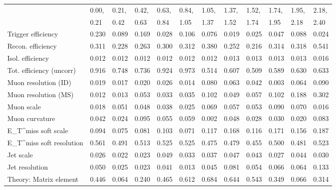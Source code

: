 \begin{tabular}{l|p{0.6cm}p{0.6cm}p{0.6cm}p{0.6cm}p{0.6cm}p{0.6cm}p{0.6cm}p{0.6cm}p{0.6cm}p{0.6cm}p{0.6cm}}
\hline
   & 0.00, & 0.21, & 0.42, & 0.63, & 0.84, & 1.05, & 1.37, & 1.52, & 1.74, & 1.95, & 2.18,  \\ 
   & 0.21 & 0.42 & 0.63 & 0.84 & 1.05 & 1.37 & 1.52 & 1.74 & 1.95 & 2.18 & 2.40  \\ 
\hline
Trigger efficiency                       & 0.230 & 0.089 & 0.169 & 0.028 & 0.106 & 0.076 & 0.019 & 0.025 & 0.047 & 0.088 & 0.024 \\
Recon. efficiency                        & 0.311 & 0.228 & 0.263 & 0.300 & 0.312 & 0.380 & 0.252 & 0.216 & 0.314 & 0.318 & 0.541 \\
Isol. efficiency                         & 0.012 & 0.012 & 0.012 & 0.012 & 0.012 & 0.012 & 0.013 & 0.013 & 0.013 & 0.013 & 0.016 \\
Tot. efficiency (uncorr)                 & 0.916 & 0.748 & 0.736 & 0.924 & 0.973 & 0.514 & 0.607 & 0.509 & 0.589 & 0.630 & 0.633 \\
Muon resolution (ID)                     & 0.019 & 0.017 & 0.020 & 0.026 & 0.014 & 0.080 & 0.063 & 0.042 & 0.003 & 0.064 & 0.090 \\
Muon resolution (MS)                     & 0.012 & 0.013 & 0.053 & 0.033 & 0.035 & 0.102 & 0.049 & 0.057 & 0.102 & 0.188 & 0.302 \\
Muon scale                               & 0.018 & 0.051 & 0.048 & 0.038 & 0.025 & 0.069 & 0.057 & 0.053 & 0.090 & 0.070 & 0.016 \\
Muon curvature                           & 0.042 & 0.024 & 0.095 & 0.055 & 0.059 & 0.002 & 0.048 & 0.028 & 0.030 & 0.020 & 0.083 \\
E_{T}^{miss} soft scale                  & 0.094 & 0.075 & 0.081 & 0.103 & 0.071 & 0.117 & 0.168 & 0.116 & 0.171 & 0.156 & 0.187 \\
E_{T}^{miss} soft resolution             & 0.561 & 0.491 & 0.513 & 0.525 & 0.525 & 0.475 & 0.479 & 0.455 & 0.500 & 0.481 & 0.523 \\
Jet scale                                & 0.026 & 0.022 & 0.023 & 0.049 & 0.033 & 0.037 & 0.047 & 0.043 & 0.027 & 0.044 & 0.030 \\
Jet resolution                           & 0.050 & 0.025 & 0.023 & 0.041 & 0.013 & 0.045 & 0.081 & 0.054 & 0.066 & 0.064 & 0.133 \\
Theory: Matrix element                   & 0.446 & 0.064 & 0.240 & 0.465 & 0.612 & 0.684 & 0.644 & 0.543 & 0.349 & 0.066 & 0.314 \\

\end{tabular}
